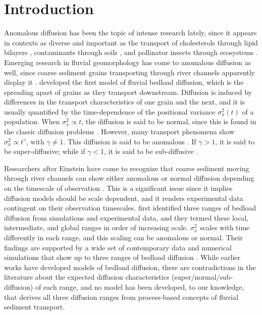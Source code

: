 \documentclass[]{agujournal2018}
\begin{document}
\section{Introduction}
Anomalous diffusion has been the topic of intense research lately, since it appears in contexts as diverse and important as the transport of cholesterols through lipid bilayers \citep{Jeon2012,Molina-Garcia2018}, contaminants through soils \citep{Berkowitz2006,Yang2019}, and pollinator insects through ecosystems \citep{Reynolds2009,Vallaeys2017}.
Emerging research in fluvial geomorphology has come to anomalous diffusion as well, since coarse sediment grains transporting through river channels apparently display it \citep{Martin2012,Bradley2017}.
\citet{Einstein1937} developed the first model of fluvial bedload diffusion, which is the spreading apart of grains as they transport downstream.
Diffusion is induced by differences in the transport characteristics of one grain and the next, and it is usually quantified by the time-dependence of the positional variance $\sigma_x^2(t)$ of a population.
When $\sigma_x^2 \propto t$, the diffusion is said to be normal, since this is found in the classic diffusion problems \citep[e.g.][]{Einstein1905,Taylor1920}.
However, many transport phenomena show $\sigma_x^2 \propto t^\gamma$, with $\gamma \neq 1$. This diffusion is said to be anomalous \citep{Sokolov2012}.
If $\gamma>1$, it is said to be super-diffusive; while if $\gamma <1$, it is said to be sub-diffusive \citep{Metzler2000}.

Researchers after Einstein have come to recognize that coarse sediment moving through river channels can show either anomalous or normal diffusion depending on the timescale of observation \citep{Nikora2002}.
This is a significant issue since it implies diffusion models should be scale dependent, and it renders experimental data contingent on their observation timescales.
\citet{Nikora2001a,Nikora2002} first identified three ranges of bedload diffusion from simulations and experimental data, and they termed these local, intermediate, and global ranges in order of increasing scale.
$\sigma_x^2$ scales with time differently in each range, and this scaling can be anomalous or normal.
Their findings are supported by a wide set of contemporary data and numerical simulations that show up to three ranges of bedload diffusion \citep{Martin2012, Bialik2012, Zhang2012, Fan2016, Bradley2017,Wu2019}.
While earlier works have developed models of bedload diffusion, there are contradictions in the literature about the expected diffusion characteristics (super/normal/sub-diffusion) of each range, and no model has been developed, to our knowledge, that derives all three diffusion ranges from process-based concepts of fluvial sediment transport.
\end{document}
